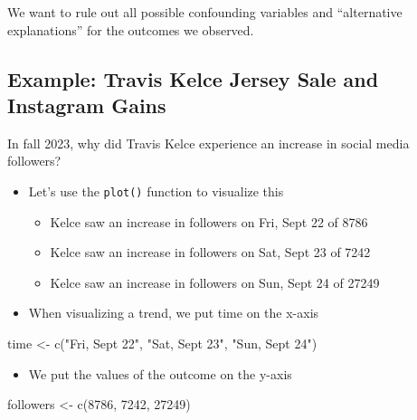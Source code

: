 \documentclass[
  letterpaper,
  DIV=11,
  numbers=noendperiod]{scrreprt}
\newenvironment{Shaded}{\begin{snugshade}}{\end{snugshade}}
\newcommand{\DecValTok}[1]{\textcolor[rgb]{0.68,0.00,0.00}{#1}}
\newcommand{\FunctionTok}[1]{\textcolor[rgb]{0.28,0.35,0.67}{#1}}
\newcommand{\NormalTok}[1]{\textcolor[rgb]{0.00,0.23,0.31}{#1}}
\newcommand{\OtherTok}[1]{\textcolor[rgb]{0.00,0.23,0.31}{#1}}
\newcommand{\StringTok}[1]{\textcolor[rgb]{0.13,0.47,0.30}{#1}}
\providecommand{\tightlist}{%
  \setlength{\itemsep}{0pt}\setlength{\parskip}{0pt}}\usepackage{longtable,booktabs,array}
\begin{document}
We want to rule out all possible confounding variables and ``alternative
explanations'' for the outcomes we observed.

\hypertarget{example-travis-kelce-jersey-sale-and-instagram-gains}{%
\subsection{Example: Travis Kelce Jersey Sale and Instagram
Gains}\label{example-travis-kelce-jersey-sale-and-instagram-gains}}

In fall 2023, why did Travis Kelce experience an increase in social
media followers?

\begin{itemize}
\tightlist
\item
  Let's use the \texttt{plot()} function to visualize this

  \begin{itemize}
  \tightlist
  \item
    Kelce saw an increase in followers on Fri, Sept 22 of 8786
  \item
    Kelce saw an increase in followers on Sat, Sept 23 of 7242
  \item
    Kelce saw an increase in followers on Sun, Sept 24 of 27249
  \end{itemize}
\item
  When visualizing a trend, we put time on the x-axis
\end{itemize}

\begin{Shaded}
\begin{Highlighting}[]
\NormalTok{time }\OtherTok{\textless{}{-}} \FunctionTok{c}\NormalTok{(}\StringTok{"Fri, Sept 22"}\NormalTok{, }\StringTok{"Sat, Sept 23"}\NormalTok{, }\StringTok{"Sun, Sept 24"}\NormalTok{)}
\end{Highlighting}
\end{Shaded}

\begin{itemize}
\tightlist
\item
  We put the values of the outcome on the y-axis
\end{itemize}

\begin{Shaded}
\begin{Highlighting}[]
\NormalTok{followers }\OtherTok{\textless{}{-}} \FunctionTok{c}\NormalTok{(}\DecValTok{8786}\NormalTok{, }\DecValTok{7242}\NormalTok{, }\DecValTok{27249}\NormalTok{)}
\end{Highlighting}
\end{Shaded}
\end{document}
